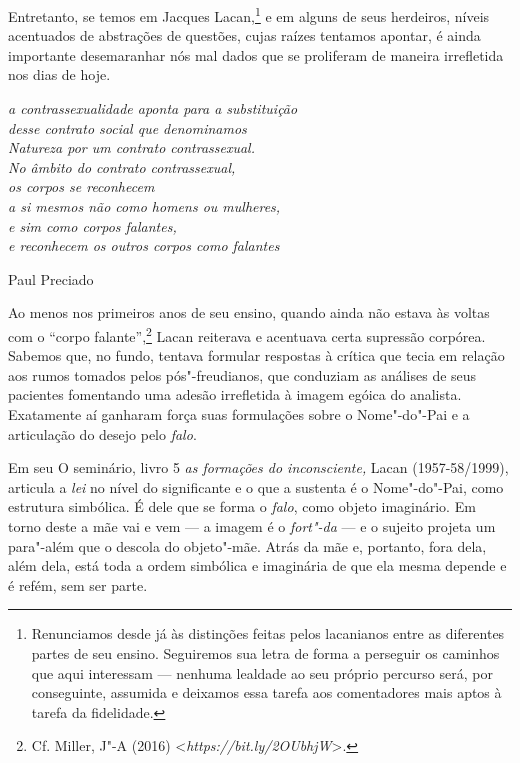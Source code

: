 Entretanto, se temos em Jacques Lacan,\footnote{Renunciamos desde já às
  distinções feitas pelos lacanianos entre as diferentes partes de seu
  ensino. Seguiremos sua letra de forma a perseguir os caminhos que aqui
  interessam --- nenhuma lealdade ao seu próprio percurso será, por
  conseguinte, assumida e deixamos essa tarefa aos comentadores mais
  aptos à tarefa da fidelidade.} e em alguns de seus herdeiros, níveis
acentuados de abstrações de questões, cujas raízes tentamos apontar, é
ainda importante desemaranhar nós mal dados que se proliferam de maneira
irrefletida nos dias de hoje.

\asterisc

\epigraph{\emph{a contrassexualidade aponta para a substituição\\
desse contrato social que denominamos\\
Natureza por um contrato contrassexual.\\
No âmbito do contrato contrassexual,\\
os corpos se reconhecem\\
a si mesmos não como homens ou mulheres,\\
e sim como corpos falantes,\\
e reconhecem os outros corpos como falantes}}{Paul Preciado}

Ao menos nos primeiros anos de seu ensino, quando ainda não estava às
voltas com o ``corpo falante'',\footnote{Cf. Miller, J"-A (2016)
  \textless{}\emph{https://bit.ly/2OUbhjW}\textgreater{}.} Lacan reiterava e acentuava certa supressão corpórea.
Sabemos que, no fundo, tentava formular respostas à crítica que tecia em
relação aos rumos tomados pelos pós"-freudianos, que conduziam as
análises de seus pacientes fomentando uma adesão irrefletida à imagem
egóica do analista. Exatamente aí ganharam força suas formulações sobre
o Nome"-do"-Pai e a articulação do desejo pelo \emph{falo}.

Em seu O seminário, livro 5 \emph{as formações do inconsciente,} Lacan
(1957-58/1999), articula a \emph{lei} no nível do significante e o que a
sustenta é o Nome"-do"-Pai, como estrutura simbólica. É dele que se forma
o \emph{falo}, como objeto imaginário. Em torno deste a mãe vai e vem ---
a imagem é o \emph{fort"-da} --- e o sujeito projeta um para"-além que o
descola do objeto"-mãe. Atrás da mãe e, portanto, fora dela, além dela,
está toda a ordem simbólica e imaginária de que ela mesma depende e é
refém, sem ser parte.

